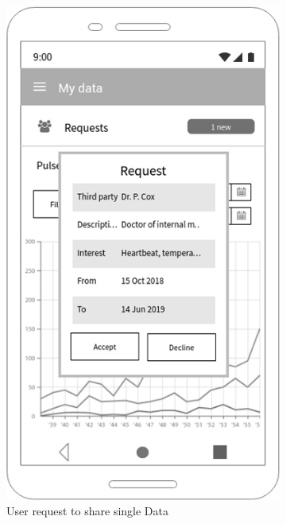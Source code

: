 \begin{figure}[h!]
 \centering
  \begin{subfigure}[b]{0.4\linewidth}
    \includegraphics[width=\linewidth]{img/mockup/u_request.jpg}
    \caption{User request to share single Data}
  \end{subfigure}
 ~ ~ ~ ~ ~ ~ 
  \begin{subfigure}[b]{0.4\linewidth}

\end{subfigure}
\end{figure}
